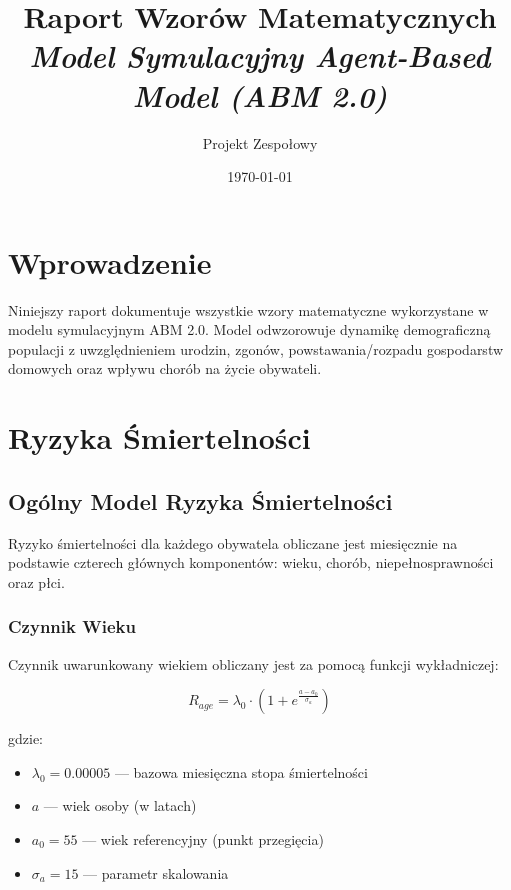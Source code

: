 \documentclass[]{article}
\title{\textbf{Raport Wzorów Matematycznych} \\
\textit{Model Symulacyjny Agent-Based Model (ABM 2.0)}}
\author{Projekt Zespołowy}
\date{\today}
\begin{document}
\maketitle

\tableofcontents
\newpage

\section{Wprowadzenie}

Niniejszy raport dokumentuje wszystkie wzory matematyczne wykorzystane w modelu symulacyjnym ABM 2.0. Model odwzorowuje dynamikę demograficzną populacji z uwzględnieniem urodzin, zgonów, powstawania/rozpadu gospodarstw domowych oraz wpływu chorób na życie obywateli.

\section{Ryzyka Śmiertelności}

\subsection{Ogólny Model Ryzyka Śmiertelności}

Ryzyko śmiertelności dla każdego obywatela obliczane jest miesięcznie na podstawie czterech głównych komponentów: wieku, chorób, niepełnosprawności oraz płci.

\subsubsection{Czynnik Wieku}

Czynnik uwarunkowany wiekiem obliczany jest za pomocą funkcji wykładniczej:

\begin{equation}
R_{age} = \lambda_0 \cdot \left(1 + e^{\frac{a - a_0}{\sigma_a}}\right)
\end{equation}

gdzie:
\begin{itemize}
    \item $\lambda_0 = 0.00005$ --- bazowa miesięczna stopa śmiertelności
    \item $a$ --- wiek osoby (w latach)
    \item $a_0 = 55$ --- wiek referencyjny (punkt przegięcia)
    \item $\sigma_a = 15$ --- parametr skalowania
\end{itemize}
\end{document}

